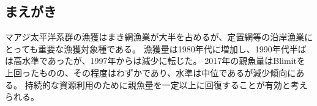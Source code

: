 \subsection{まえがき}マアジ太平洋系群の漁獲はまき網漁業が大半を占めるが、定置網等の沿岸漁業にとっても重要な漁獲対象種である。
漁獲量は1980年代に増加し、1990年代半ばは高水準であったが、1997年からは減少に転じた。
2017年の親魚量はBlimitを上回ったものの、その程度はわずかであり、水準は中位であるが減少傾向にある。
持続的な資源利用のために親魚量を一定以上に回復することが有効と考えられる。